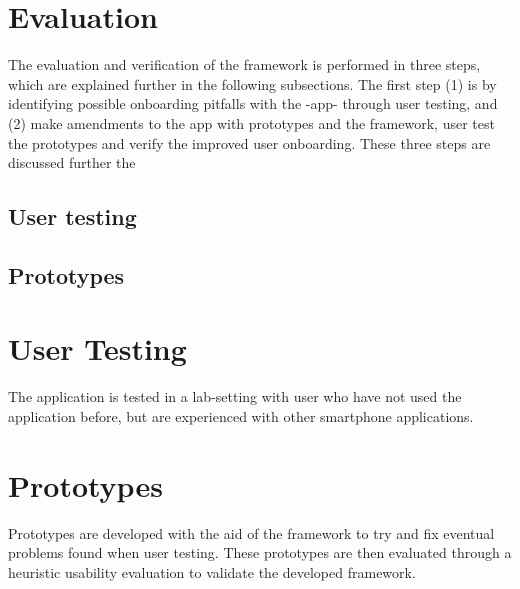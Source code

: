 \section{Evaluation}
The evaluation and verification of the framework is performed in three steps, which are explained further in the following subsections. The first step (1) is by identifying possible onboarding pitfalls with the -app- through user testing, and (2) make amendments to the app with prototypes and the framework,  user test the prototypes and verify the improved user onboarding. These three steps are discussed further the

\subsection{User testing}

\subsection{Prototypes}

\section{User Testing}
The application is tested in a lab-setting with user who have not used the application before, but are experienced with other smartphone applications. 

\section{Prototypes}
%
Prototypes are developed with the aid of the framework to try and fix eventual problems found when user testing. These prototypes are then evaluated through a heuristic usability evaluation to validate the developed framework.
